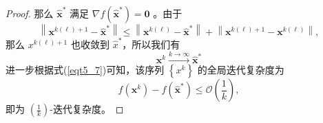 \begin{proof}
    那么 $\hat{\bm{x}}^{*}$ 满足 $\nabla f\left(\hat{\bm{x}}^{*}\right)=\mathbf{0}$ 。由于
    \begin{equation}
        \left\|\bm{x}^{k(\ell)+1}-\hat{\bm{x}}^{*}\right\| \leq\left\|\bm{x}^{k(\ell)}-\hat{\bm{x}}^{*}\right\|+\left\|\bm{x}^{k(\ell)+1}-\bm{x}^{k(\ell)}\right\| ,
        \nonumber
    \end{equation}
    那么 $x^{k(\ell)+1}$ 也收敛到 $\hat{x}^{*}$，所以我们有
    \begin{equation}
        \bm{x}^{k} \stackrel{k \rightarrow \infty}{\longrightarrow} \hat{\bm{x}}^{*}
        \nonumber
    \end{equation}
    进一步根据式(\ref{eqt5_7})可知，该序列 $\left\{x^{k}\right\}$ 的全局迭代复杂度\cite{6302929}为
    \begin{equation}
        f\left(\bm{x}^{k}\right)-f\left(\hat{\bm{x}}^{*}\right) \leq \mathcal{O}\left(\frac{1}{k}\right),
        \nonumber
    \end{equation}
    即为 $\left(\frac{1}{k}\right)$-迭代复杂度。
\end{proof}

